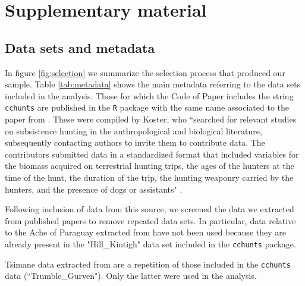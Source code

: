 \section{Supplementary material}
\subsection{Data sets and metadata}
In figure \ref{fig:selection} we summarize the selection process that produced our sample. Table \ref{tab:metadata} shows the main metadata referring to the data sets included in the analysis. Those for which the Code of Paper includes the string \texttt{cchunts} are published in the \texttt{R} package with the same name associated to the paper from \citet{koster_life_2020}. These were compiled by Koster, who ``searched for relevant studies on subsistence hunting in the anthropological and biological literature, subsequently contacting authors to invite them to contribute data. The contributors submitted data in a standardized format that included variables for the biomass acquired on terrestrial hunting trips, the ages of the hunters at the time of the hunt, the duration of the trip, the hunting weaponry carried by the hunters, and the presence of dogs or assistants" \citep{koster_life_2020}.

Following inclusion of data from this source, we screened the data we extracted from published papers to remove repeated data sets. In particular, data relative to the Ache of Paraguay extracted from \citet{walker_age-dependency_2002} have not been used because they are already present in the "Hill\_Kintigh" data set included in the \texttt{cchunts} package. 

Tsimane data extracted from \citet{gurven_how_2006} are a repetition of those included in the \texttt{cchunts} data (``Trumble\_Gurven"). Only the latter were used in the analysis.


